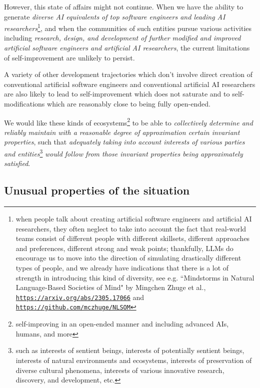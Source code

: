 \documentclass{article}
\begin{document}
However, this state of affairs might not continue. When we have the ability to generate
{\em diverse AI equivalents of top software engineers and leading AI researchers}\footnote{when people
talk about creating  artificial software engineers and artificial AI researchers, they often neglect to take
into account the fact that real-world teams consist of different people with different skillsets, different
approaches and preferences, different strong and weak points; thankfully, LLMs do encourage us
to move into the direction of simulating drastically different types of people, and we already have indications
that there is a lot of strength in introducing this kind of diversity, see e.g. ``Mindstorms in Natural Language-Based Societies of Mind"
by Mingchen Zhuge et al., \href{https://arxiv.org/abs/2305.17066}{\tt https://arxiv.org/abs/2305.17066} and
\href{https://github.com/mczhuge/NLSOM}{\tt https://github.com/mczhuge/NLSOM} 
}, and when the communities
of such entities pursue various activities including {\em research, design, and development of further
modified and improved artificial software engineers and artificial AI researchers}, the current
limitations of self-improvement are unlikely to persist.

A variety of other development trajectories which don't involve direct creation of conventional artificial software engineers
and conventional artificial AI researchers are also likely to lead to self-improvement
which does not saturate and to self-modifications which are reasonably close to being
fully open-ended. 

We would like these kinds of ecosystems\footnote{self-improving in an open-ended manner and including
advanced AIs, humans, and more} to be able to {\em collectively determine and 
reliably maintain with a reasonable degree of approximation certain invariant properties}, such
that {\em adequately taking into account interests of various parties and entities}\footnote{such as interests of sentient
beings, interests of potentially sentient beings, interests of natural environments and ecosystems,
interests of preservation of diverse cultural phenomena, interests of various innovative research,
discovery, and development, etc.} {\em would follow from those invariant properties being
approximately satisfied}.

\subsection{Unusual properties of the situation}
\end{document}
